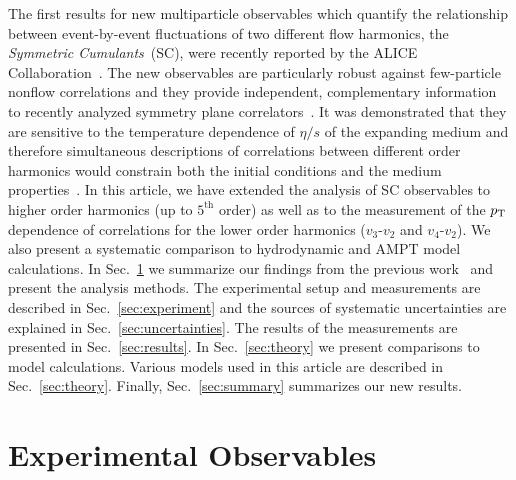 The first results for new multiparticle observables which quantify the relationship between event-by-event fluctuations of two different flow harmonics, the \textit{Symmetric Cumulants}~(SC), were recently reported by the ALICE Collaboration~\cite{ALICE:2016kpq}.
The new observables are particularly robust against few-particle nonflow correlations and they provide independent, complementary information to recently analyzed symmetry plane correlators~\cite{Aad:2014fla}. 
It was demonstrated that they are sensitive to the temperature dependence of $\eta/s$ of the expanding medium and therefore simultaneous descriptions of correlations between different order harmonics would constrain both the initial conditions and the medium properties~\cite{ALICE:2016kpq,Zhu:2016puf}.
In this article, we have extended the analysis of SC observables to higher order harmonics (up to $5^{\mathrm{th}}$ order) as well as to the measurement of the $p_{\rm T}$ dependence of correlations for the lower order harmonics ($v_3$-$v_2$ and $v_4$-$v_2$).  We also present a systematic comparison to hydrodynamic and AMPT model calculations.
In Sec.~\ref{sec:method} we summarize our findings from the previous work~\cite{ALICE:2016kpq} and present the analysis methods. The experimental setup and measurements are described in Sec.~\ref{sec:experiment} and the sources of systematic uncertainties are explained in Sec.~\ref{sec:uncertainties}. The results of the measurements are presented in Sec.~\ref{sec:results}. 
 In Sec.~\ref{sec:theory} we present comparisons to model calculations. Various models used in this article are described in Sec.~\ref{sec:theory}. Finally, Sec.~\ref{sec:summary} summarizes our new results.
 
\section{Experimental Observables}
\label{sec:method}

